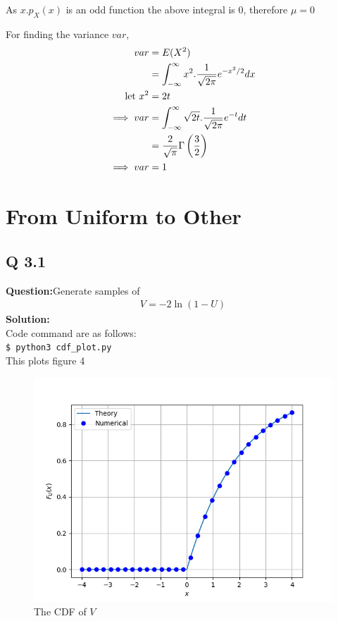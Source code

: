 \documentclass[journal,12pt,twocolumn]{IEEEtran}
\providecommand{\brak}[1]{\ensuremath{\left(#1\right)}}
\begin{document}
As $x . p_X(x)$ is an odd function the above integral is $0$, therefore $\mu = 0$

For finding the variance $var$,
\begin{align}
    var &= E(X^2) \\
    &= \int _ {- \infty} ^ {\infty} {x^2 . \frac{1}{\sqrt{2 \pi}} e^{-x^2 / 2} dx} \\
    \text{let\,\,} x^2 &= 2t \\
    \implies var &= \int _ {- \infty} ^ {\infty} {\sqrt{2t} . \frac{1}{\sqrt{2\pi}} e^{-t} dt} \\
    &= \frac{2}{\sqrt{\pi}} \Gamma \left(\frac{3}{2}\right) \\
    \implies var &= 1
\end{align}


\section{From Uniform to Other}
\subsection{Q 3.1}
\noindent \textbf{Question:}Generate samples of\\
%
\begin{align}
V = -2\ln\brak{1-U}
\end{align}
\noindent \textbf{Solution: }\\
Code command are as follows:\\
\texttt{\$ python3 cdf\_plot.py}\\
This plots figure 4\\
\begin{figure}[!ht]
\centering
\includegraphics[width=\columnwidth]{./figs/Figure_Q4.png}
\caption{The CDF of $V$}
\label{fig:CDF_V}
\end{figure}
\end{document}
